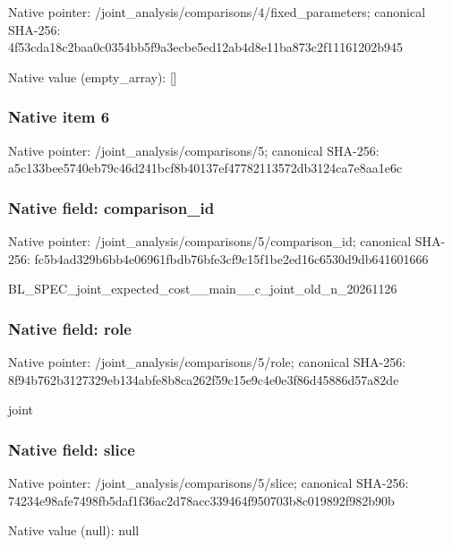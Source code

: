 \documentclass[10pt,a4paper]{article}
\begin{document}
Native pointer: /joint\_analysis/comparis\allowbreak{}ons/4/fixed\_parameters; canonical SHA-256: 4f53cda18c2baa0c0354bb5f\allowbreak{}9a3ecbe5ed12ab4d8e11ba87\allowbreak{}3c2f11161202b945



Native value (empty\_array): []



\subsubsection{Native item 6}


Native pointer: /joint\_analysis/comparisons/5; canonical SHA-256: a5c133bee5740eb79c46d241\allowbreak{}bcf8b40137ef47782113572d\allowbreak{}b3124ca7e8aa1e6c



\subsubsection{Native field: comparison\_id}


Native pointer: /joint\_analysis/comparis\allowbreak{}ons/5/comparison\_id; canonical SHA-256: fc5b4ad329b6bb4e06961fbd\allowbreak{}b76bfe3cf9c15f1be2ed16c6\allowbreak{}530d9db641601666


BL\_SPEC\_joint\_expected\_c\allowbreak{}ost\_\_main\_\_c\_joint\_old\_n\allowbreak{}\_20261126


\subsubsection{Native field: role}


Native pointer: /joint\_analysis/comparisons/5/role; canonical SHA-256: 8f94b762b3127329eb134abf\allowbreak{}e8b8ca262f59c15e9c4e0e3f\allowbreak{}86d45886d57a82de


joint


\subsubsection{Native field: slice}


Native pointer: /joint\_analysis/comparisons/5/slice; canonical SHA-256: 74234e98afe7498fb5daf1f3\allowbreak{}6ac2d78acc339464f950703b\allowbreak{}8c019892f982b90b



Native value (null): null
\end{document}
